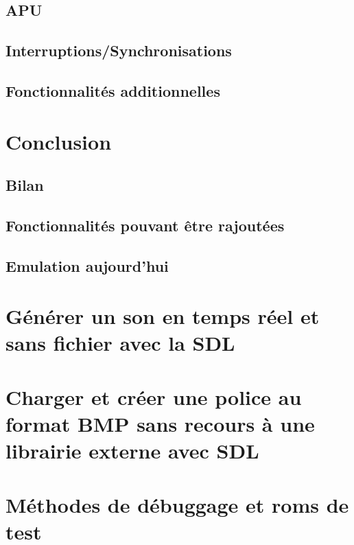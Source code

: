 \documentclass{report}
\begin{document}
\section{APU}
\section{Interruptions/Synchronisations}
\section{Fonctionnalités additionnelles}
\chapter{Conclusion}
\section{Bilan}
\section{Fonctionnalités pouvant être rajoutées}
\section{Emulation aujourd'hui}

\appendix
\chapter{Générer un son en temps réel et sans fichier avec la SDL}
\chapter{Charger et créer une police au format BMP sans recours à une librairie externe avec SDL}
\chapter{Méthodes de débuggage et roms de test}
\end{document}
